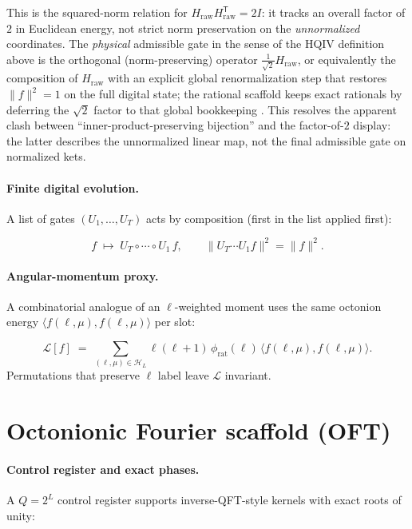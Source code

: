 \documentclass[11pt,a4paper]{article}
\theoremstyle{remark}
\begin{document}
This is the squared-norm relation for $H_{\mathrm{raw}}H_{\mathrm{raw}}^{\mathsf T}=2I$: it tracks an overall factor of $2$ in Euclidean energy, not strict norm preservation on the \emph{unnormalized} coordinates. The \emph{physical} admissible gate in the sense of the HQIV definition above is the orthogonal (norm-preserving) operator $\tfrac{1}{\sqrt{2}}H_{\mathrm{raw}}$, or equivalently the composition of $H_{\mathrm{raw}}$ with an explicit global renormalization step that restores $\|f\|^2=1$ on the full digital state; the rational scaffold keeps exact rationals by deferring the $\sqrt{2}$ factor to that global bookkeeping \cite{hadamardMatrixMathWorld}. This resolves the apparent clash between ``inner-product-preserving bijection'' and the factor-of-$2$ display: the latter describes the unnormalized linear map, not the final admissible gate on normalized kets.

\paragraph{Finite digital evolution.}
A list of gates $(U_1,\ldots,U_T)$ acts by composition (first in the list applied first):

\begin{equation}
  f \;\mapsto\; U_T\circ\cdots\circ U_1\,f,
  \qquad
  \|U_T\cdots U_1 f\|^2=\|f\|^2.
\end{equation}

\paragraph{Angular-momentum proxy.}
A combinatorial analogue of an $\ell$-weighted moment uses the same octonion energy $\langle f(\ell,\mu),f(\ell,\mu)\rangle$ per slot:

\begin{equation}
  \mathcal{L}[f] \;=\; \sum_{(\ell,\mu)\in\mathcal{H}_L}
    \ell(\ell+1)\,\phi_{\mathrm{rat}}(\ell)\,\langle f(\ell,\mu),f(\ell,\mu)\rangle.
\end{equation}
Permutations that preserve $\ell$ label leave $\mathcal{L}$ invariant.

\section{Octonionic Fourier scaffold (OFT)}

\paragraph{Control register and exact phases.}
A $Q=2^L$ control register supports inverse-QFT-style kernels with exact roots of unity:
\end{document}
